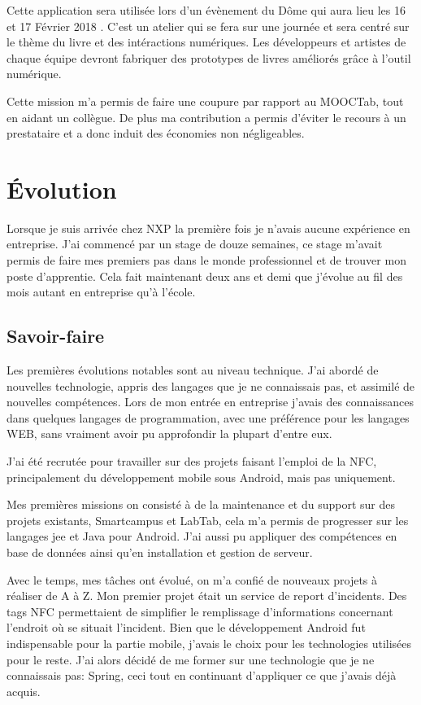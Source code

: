 \documentclass[french,12pt,a4paper,titlepage,openright,openbib]{report}
\begin{document}
Cette application sera utilisée lors d'un évènement du Dôme qui aura lieu les 16 et 17 Février 2018 \cite{website:ledome}. C'est un atelier qui se fera sur une journée et sera centré sur le thème du livre et des intéractions numériques. Les développeurs et artistes de chaque équipe devront fabriquer des prototypes de livres améliorés grâce à l'outil numérique.

Cette mission m'a permis de faire une coupure par rapport au MOOCTab, tout en aidant un collègue. De plus ma contribution a permis d'éviter le recours à un prestataire et a donc induit des économies non négligeables.
\chapter{Évolution}
Lorsque je suis arrivée chez NXP la première fois je n'avais aucune expérience en entreprise. J'ai commencé par un stage de douze semaines, ce stage m'avait permis de faire mes premiers pas dans le monde professionnel et de trouver mon poste d'apprentie.
Cela fait maintenant deux ans et demi que j'évolue au fil des mois autant en entreprise qu'à l'école.
\section{Savoir-faire}
Les premières évolutions notables sont au niveau technique. J'ai abordé de nouvelles technologie, appris des langages que je ne connaissais pas, et assimilé de nouvelles compétences.
Lors de mon entrée en entreprise j'avais des connaissances dans quelques langages de programmation, avec une préférence pour les langages WEB, sans vraiment avoir pu approfondir la plupart d'entre eux.

J'ai été recrutée pour travailler sur des projets faisant l'emploi de la NFC, principalement du développement mobile sous Android, mais pas uniquement.

Mes premières missions on consisté à de la maintenance et du support sur des projets existants, Smartcampus et LabTab, cela m'a permis de progresser sur les langages \gls{jee} et Java pour Android. J'ai aussi pu appliquer des compétences en base de données ainsi qu'en installation et gestion de serveur.

Avec le temps, mes tâches ont évolué, on m'a confié de nouveaux projets à réaliser de A à Z.
Mon premier projet était un service de report d'incidents. Des tags NFC permettaient de simplifier le remplissage d'informations concernant l'endroit où se situait l'incident.
Bien que le développement Android fut indispensable pour la partie mobile, j'avais le choix pour les technologies utilisées pour le reste. J'ai alors décidé de me former sur une technologie que je ne connaissais pas: Spring, ceci tout en continuant d'appliquer ce que j'avais déjà acquis.
\end{document}
